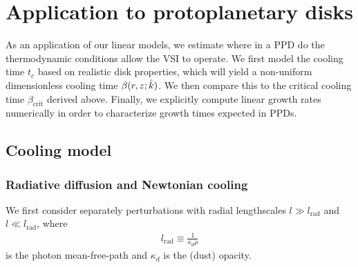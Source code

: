 \section{Application to protoplanetary disks}\label{application} 

As an application of our linear models, we estimate where in a
PPD do the thermodynamic conditions allow the VSI to
operate. We first model the cooling time $t_c$ based on realistic
disk properties, which will yield a non-uniform dimensionless cooling
time $\beta(r,z;\hat{k})$. We then compare this to the critical cooling time
$\beta_\mathrm{crit}$ derived above. Finally, we explicitly compute 
linear growth rates numerically in order to characterize 
growth times expected in PPDs.  


\subsection{Cooling model} 


\subsubsection{Radiative diffusion and Newtonian cooling}

We first consider separately perturbations with radial lengthscales
$l\gg l_\mathrm{rad}$ and $l\ll l_\mathrm{rad}$, where       
\begin{align}\label{lrad}
  l_\mathrm{rad} \equiv \frac{1}{\kappa_d\rho} 
\end{align} is the photon mean-free-path and $\kappa_d$ is the (dust)
opacity. 

